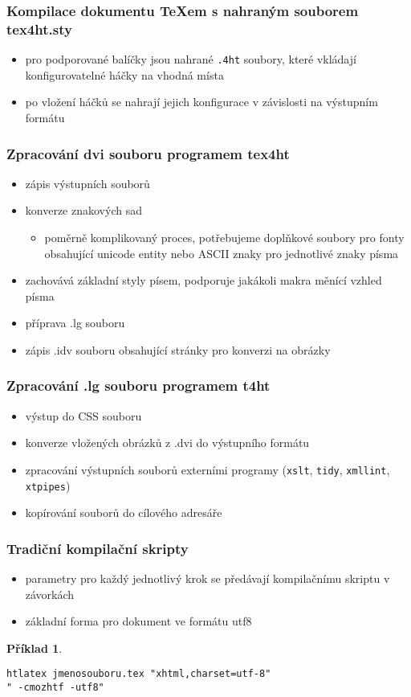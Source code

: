 \documentclass[czech]{beamer}
\newtheorem{priklad}{Příklad}
\begin{document}
\begin{frame}
  \frametitle{Kompilace dokumentu TeXem s nahraným souborem tex4ht.sty}
  \begin{itemize}
    \item pro podporované balíčky jsou nahrané \texttt{.4ht} soubory, které vkládají
        konfigurovatelné háčky na vhodná místa
    \item po vložení háčků se nahrají jejich konfigurace v závislosti na
        výstupním formátu
  \end{itemize}
\end{frame}

\begin{frame}
  \frametitle{Zpracování dvi souboru programem tex4ht}
  \begin{itemize}
    \item   zápis výstupních souborů
    \item   konverze znakových sad
      \begin{itemize} 
        \item  poměrně komplikovaný proces, potřebujeme
          doplňkové soubory pro fonty obsahující unicode entity nebo ASCII
          znaky pro jednotlivé znaky písma
  \end{itemize}
    \item   zachovává základní styly písem, podporuje jakákoli makra měnící vzhled písma
    \item   příprava .lg souboru
    \item   zápis .idv souboru obsahující stránky pro konverzi na obrázky
  \end{itemize}
\end{frame}

\begin{frame}
  \frametitle{Zpracování .lg souboru programem t4ht}
  \begin{itemize}
    \item   výstup do CSS souboru
    \item   konverze vložených obrázků z .dvi do výstupního formátu
    \item   zpracování výstupních souborů externími programy 
    (\texttt{xslt}, \texttt{tidy}, \texttt{xmllint}, \texttt{xtpipes})
    \item   kopírování souborů do cílového adresáře
  \end{itemize}
\end{frame}

\begin{frame}[fragile]
  \frametitle{Tradiční kompilační skripty}
  \begin{itemize}
    \item parametry pro každý jednotlivý krok se předávají kompilačnímu skriptu v závorkách
    \item základní forma pro dokument ve formátu utf8
  \end{itemize}
      \begin{priklad}
        \small 
\begin{verbatim}
htlatex jmenosouboru.tex "xhtml,charset=utf-8" 
" -cmozhtf -utf8"
\end{verbatim}
     \end{priklad}
\end{frame}
\end{document}
